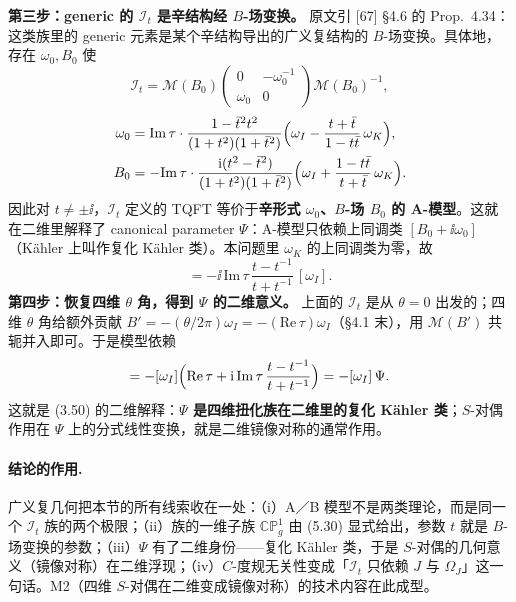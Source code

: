 \textbf{第三步：generic 的 $\mathcal I_t$ 是辛结构经 $B$-场变换。} 原文引 [67] §4.6 的 Prop.\ 4.34：这类族里的 generic 元素是某个辛结构导出的广义复结构的 $B$-场变换。具体地，存在 $\omega_0,B_0$ 使\pA{}
\begin{equation}
\mathcal I_t=\mathcal M(B_0)\begin{pmatrix}0&-\omega_0^{-1}\\ \omega_0&0\end{pmatrix}\mathcal M(B_0)^{-1},
\label{eq:Isym}
\end{equation}
\begin{equation}
\begin{aligned}
\omega_0&=\mathrm{Im}\,\tau\cdot\frac{1-\bar t^2t^2}{(1+t^2)(1+\bar t^2)}\Bigl(\omega_I-\frac{t+\bar t}{1-t\bar t}\,\omega_K\Bigr),\\
B_0&=-\mathrm{Im}\,\tau\cdot\frac{\mathrm{i}(t^2-\bar t^2)}{(1+t^2)(1+\bar t^2)}\Bigl(\omega_I+\frac{1-t\bar t}{t+\bar t}\,\omega_K\Bigr).
\end{aligned}
\label{eq:omega0}
\end{equation}
因此对 $t\ne\pm\ii$，$\mathcal I_t$ 定义的 TQFT 等价于\textbf{辛形式 $\omega_0$、$B$-场 $B_0$ 的 A-模型}。这就在二维里解释了 canonical parameter $\Psi$：A-模型只依赖上同调类 $[B_0+\ii\omega_0]$（Kähler 上叫作复化 Kähler 类）。本问题里 $\omega_K$ 的上同调类为零，故\pA{}
\begin{equation}
[B_0+\ii\omega_0]=-\ii\,\mathrm{Im}\,\tau\,\frac{t-t^{-1}}{t+t^{-1}}\,[\omega_I].
\label{eq:class}
\end{equation}
\textbf{第四步：恢复四维 $\theta$ 角，得到 $\Psi$ 的二维意义。} 上面的 $\mathcal I_t$ 是从 $\theta=0$ 出发的；四维 $\theta$ 角给额外贡献 $B'=-(\theta/2\pi)\omega_I=-(\mathrm{Re}\,\tau)\omega_I$（§4.1 末），用 $\mathcal M(B')$ 共轭并入即可。于是模型依赖\pA{}
\begin{equation}
[B_0+B'+\ii\omega_0]
=-[\omega_I]\Bigl(\mathrm{Re}\,\tau+\ii\,\mathrm{Im}\,\tau\,\frac{t-t^{-1}}{t+t^{-1}}\Bigr)
=-[\omega_I]\,\Psi .
\label{eq:Psired}
\end{equation}
这就是 (3.50) 的二维解释：\textbf{$\Psi$ 是四维扭化族在二维里的复化 Kähler 类}；$S$-对偶作用在 $\Psi$ 上的分式线性变换，就是二维镜像对称的通常作用\pA{}。

\paragraph{结论的作用.}
广义复几何把本节的所有线索收在一处：（i）A／B 模型不是两类理论，而是同一个 $\mathcal I_t$ 族的两个极限；（ii）族的一维子族 $\mathbb{CP}^1_g$ 由 (5.30) 显式给出，参数 $t$ 就是 $B$-场变换的参数；（iii）$\Psi$ 有了二维身份——复化 Kähler 类，于是 $S$-对偶的几何意义（镜像对称）在二维浮现；（iv）$C$-度规无关性变成「$\mathcal I_t$ 只依赖 $J$ 与 $\Omega_J$」这一句话\pA{}。M2（四维 $S$-对偶在二维变成镜像对称）的技术内容在此成型\pC。

